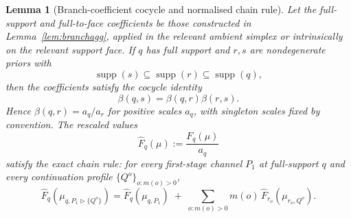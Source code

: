 \documentclass[11pt,a4paper]{article}
\newtheorem{lemma}[theorem]{Lemma}
\theoremstyle{definition}
\newcommand{\1}{\mathbf 1}
\begin{document}
\begin{lemma}[Branch-coefficient cocycle and normalised chain rule]\label{lem:chain}
Let the full-support and full-to-face coefficients be those constructed in Lemma~\ref{lem:branchagg}, applied in the
relevant ambient simplex or intrinsically on the relevant support face.  If $q$ has full support and $r,s$ are
nondegenerate priors with
\[
\operatorname{supp}(s)\subseteq\operatorname{supp}(r)\subseteq\operatorname{supp}(q),
\]
then the coefficients satisfy the cocycle identity
\[
\beta(q,s)=\beta(q,r)\beta(r,s).
\]
Hence $\beta(q,r)=a_q/a_r$ for positive scales $a_q$, with singleton scales fixed by convention.  The rescaled values
\[
\widehat F_q(\mu):=\frac{F_q(\mu)}{a_q}
\]
satisfy the exact chain rule: for every first-stage channel $P_1$ at full-support $q$ and every continuation profile
$\{Q^o\}_{o:m(o)>0}$,
\[
\widehat F_q(\mu_{q,P_1\triangleright\{Q^o\}})
=
\widehat F_q(\mu_{q,P_1})
\;+\;
\sum_{o:m(o)>0}m(o)\,\widehat F_{r_o}(\mu_{r_o,Q^o}).
\]
\end{lemma}
\end{document}
